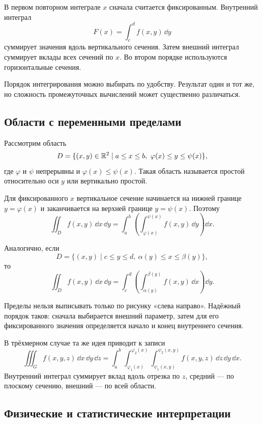 В первом повторном интеграле $x$ сначала считается фиксированным. Внутренний интеграл
\[
F(x)=\int_c^d f(x,y)\,\dd y
\]
суммирует значения вдоль вертикального сечения. Затем внешний интеграл суммирует вклады всех сечений по $x$. Во втором порядке используются горизонтальные сечения.

Порядок интегрирования можно выбирать по удобству. Результат один и тот же, но сложность промежуточных вычислений может существенно различаться.

\subsection{Области с переменными пределами}

Рассмотрим область
\begin{equation}
D
=
\{(x,y)\in\mathbb{R}^2
\mid
 a\leq x\leq b,
\ \varphi(x)\leq y\leq\psi(x)\},
\label{eq:x-simple-domain}
\end{equation}
где $\varphi$ и $\psi$ непрерывны и $\varphi(x)\leq\psi(x)$. Такая область называется простой относительно оси $y$ или вертикально простой.

Для фиксированного $x$ вертикальное сечение начинается на нижней границе $y=\varphi(x)$ и заканчивается на верхней границе $y=\psi(x)$. Поэтому
\begin{equation}
\iint_D f(x,y)\,\dd x\,\dd y
=
\int_a^b
\left(
\int_{\varphi(x)}^{\psi(x)}f(x,y)\,\dd y
\right)\dd x.
\label{eq:fubini-x-simple}
\end{equation}

Аналогично, если
\[
D
=
\{(x,y)
\mid
 c\leq y\leq d,
\ \alpha(y)\leq x\leq\beta(y)\},
\]
то
\begin{equation}
\iint_D f(x,y)\,\dd x\,\dd y
=
\int_c^d
\left(
\int_{\alpha(y)}^{\beta(y)}f(x,y)\,\dd x
\right)\dd y.
\label{eq:fubini-y-simple}
\end{equation}

Пределы нельзя выписывать только по рисунку «слева направо». Надёжный порядок таков: сначала выбирается внешний параметр, затем для его фиксированного значения определяется начало и конец внутреннего сечения.

В трёхмерном случае та же идея приводит к записи
\[
\iiint_G f(x,y,z)\,\dd x\,\dd y\,\dd z
=
\int_a^b
\int_{\varphi_1(x)}^{\varphi_2(x)}
\int_{\psi_1(x,y)}^{\psi_2(x,y)}
 f(x,y,z)\,\dd z\,\dd y\,\dd x.
\]
Внутренний интеграл суммирует вклад вдоль отрезка по $z$, средний --- по плоскому сечению, внешний --- по всей области.

\subsection{Физические и статистические интерпретации}


